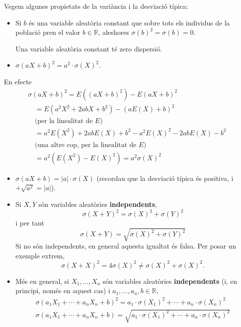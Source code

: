 \documentclass[
]{book}
\newenvironment{rmdblock}[1]
  {
  \begin{itemize}
  \renewcommand{\labelitemi}{
    \raisebox{-.7\height}[0pt][0pt]{
      {\setkeys{Gin}{width=3em,keepaspectratio}\texttt{[image: Bioestadística-II\_files/figure-html/\#1]}}
    }
  }
  \setlength{\fboxsep}{1em}
  \begin{kframe}
  \item
  }
  {
  \end{kframe}
  \end{itemize}
  }
\newenvironment{rmdcorbes}
  {\begin{rmdblock}{corbes}}
  {\end{rmdblock}}
\theoremstyle{definition}
\theoremstyle{definition}
\theoremstyle{definition}
\theoremstyle{remark}
\begin{document}
Vegem algunes propietats de la variància i la desviació típica:

\begin{itemize}
\item
  Si \(b\) és una variable aleatòria constant que sobre tots els individus de la població pren el valor \(b\in \mathbb{R}\), aleshores \(\sigma(b)^2=\sigma(b)=0\).

  Una variable aleatòria constant té zero dispersió.
\item
  \(\sigma(aX+b)^2=a^2\cdot \sigma(X)^2\).
\end{itemize}

\begin{rmdcorbes}
En efecte
\[
\begin{array}{l}
\sigma(aX+b)^2 =E((aX+b)^2)-E(aX+b)^2\\
\quad = E(a^2X^2+2abX+b^2)-(aE(X)+b)^2\\
\quad \text{(per la linealitat de $E$)}\\
\quad = a^2E(X^2)+2abE(X)+b^2-a^2E(X)^2-2abE(X)-b^2\\
\quad \text{(una altre cop, per la linealitat de $E$)}\\
\quad = a^2(E(X^2)-E(X)^2)=a^2\sigma(X)^2
\end{array}
\]
\end{rmdcorbes}

\begin{itemize}
\item
  \(\sigma(aX+b)=|a|\cdot \sigma(X)\) (recordau que la desviació típica és positiva, i \(+\sqrt{a^2}=|a|\)).
\item
  Si \(X,Y\) són variables aleatòries \textbf{independents},
  \[
  \sigma(X+Y)^2=\sigma(X)^2+\sigma(Y)^2
  \]
  i per tant
  \[
  \sigma(X+Y)=\sqrt{\sigma(X)^2+\sigma(Y)^2}
  \]
  Si no són independents, en general aquesta igualtat és falsa. Per posar un exemple extrem,
  \[
  \sigma(X+X)^2=4\sigma(X)^2 \neq \sigma(X)^2+\sigma(X)^2.
  \]
\item
  Més en general, si \(X_1,\ldots,X_n\) són variables aleatòries \textbf{independents} (i, en principi, només en aquest cas) i \(a_1,\ldots,a_n,b\in \mathbb{R}\),
  \[
  \begin{array}{l}
  \sigma(a_1X_1+\cdots+a_nX_n+b)^2=a_1\cdot\sigma(X_1)^2+\cdots+a_n\cdot\sigma(X_n)^2\\
  \sigma(a_1X_1+\cdots+a_nX_n+b)=\sqrt{a_1\cdot\sigma(X_1)^2+\cdots+a_n\cdot\sigma(X_n)^2}
  \end{array}
  \]
\end{itemize}
\end{document}
